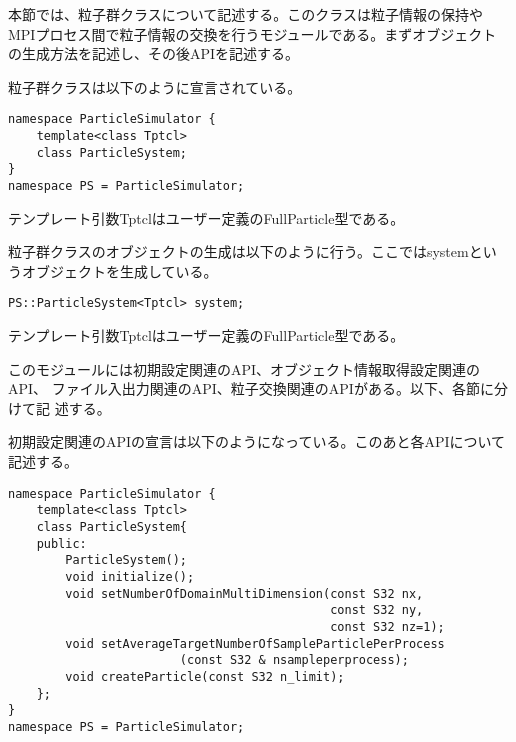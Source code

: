 本節では、粒子群クラスについて記述する。このクラスは粒子情報の保持や
MPIプロセス間で粒子情報の交換を行うモジュールである。まずオブジェクト
の生成方法を記述し、その後APIを記述する。


粒子群クラスは以下のように宣言されている。
\begin{lstlisting}[caption=ParticleSystem0]
namespace ParticleSimulator {
    template<class Tptcl>
    class ParticleSystem;
}
namespace PS = ParticleSimulator;
\end{lstlisting}
テンプレート引数Tptclはユーザー定義のFullParticle型である。

粒子群クラスのオブジェクトの生成は以下のように行う。ここではsystemとい
うオブジェクトを生成している。
\begin{screen}
\begin{verbatim}
PS::ParticleSystem<Tptcl> system;
\end{verbatim}
\end{screen}
テンプレート引数Tptclはユーザー定義のFullParticle型である。


このモジュールには初期設定関連のAPI、オブジェクト情報取得設定関連のAPI、
ファイル入出力関連のAPI、粒子交換関連のAPIがある。以下、各節に分けて記
述する。


初期設定関連のAPIの宣言は以下のようになっている。このあと各APIについて
記述する。
\begin{lstlisting}[caption=ParticleSystem1]
namespace ParticleSimulator {
    template<class Tptcl>
    class ParticleSystem{
    public:
        ParticleSystem();
        void initialize();
        void setNumberOfDomainMultiDimension(const S32 nx,
                                             const S32 ny,
                                             const S32 nz=1);
        void setAverageTargetNumberOfSampleParticlePerProcess
                        (const S32 & nsampleperprocess);
        void createParticle(const S32 n_limit);
    };
}
namespace PS = ParticleSimulator;
\end{lstlisting}



